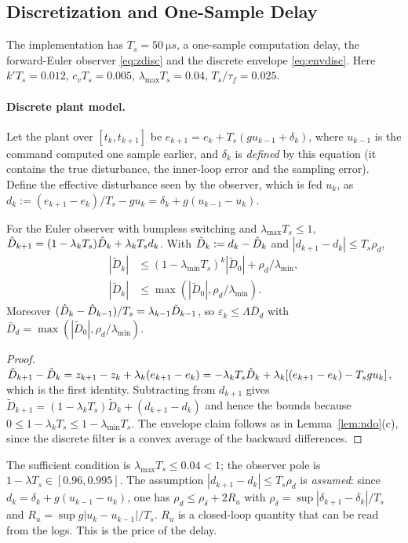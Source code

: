 \subsection{Discretization and One-Sample Delay}\label{ap:disc}
The implementation has $T_s=\SI{50}{\micro s}$, a one-sample computation delay, the forward-Euler observer \eqref{eq:zdisc} and the discrete envelope \eqref{eq:envdisc}. Here $k'T_s=0.012$, $c_vT_s=0.005$, $\lambda_{\max}T_s=0.04$, $T_s/\tau_f=0.025$.

\paragraph{Discrete plant model.} Let the plant over $[t_k,t_{k+1}]$ be $e_{k+1}=e_k+T_s(gu_{k-1}+\delta_k)$, where $u_{k-1}$ is the command computed one sample earlier, and $\delta_k$ is \emph{defined} by this equation (it contains the true disturbance, the inner-loop error and the sampling error). Define the effective disturbance seen by the observer, which is fed $u_k$, as $d_k:=(e_{k+1}-e_k)/T_s-gu_k=\delta_k+g(u_{k-1}-u_k)$.

\begin{lemma}\label{prop:disc-ndo}
For the Euler observer with bumpless switching and $\lambda_{\max}T_s\le1$, $\hat{D}_{k+1}=(1-\lambda_kT_s)\hat{D}_k+\lambda_kT_sd_k$. With $\tilde D_k:=d_k-\hat{D}_k$ and $|d_{k+1}-d_k|\le T_s\rho_d$,
\begin{align*}
|\tilde D_k|&\le(1-\lambda_{\min}T_s)^{k}|\tilde D_0|+\rho_d/\lambda_{\min},\\
|\tilde D_k|&\le\max(|\tilde D_0|,\rho_d/\lambda_{\min}).
\end{align*}
Moreover $(\hat{D}_{k}-\hat{D}_{k-1})/T_s=\lambda_{k-1}\tilde D_{k-1}$, so $\varepsilon_k\le\Lambda\bar D_d$ with $\bar D_d=\max(|\tilde D_0|,\rho_d/\lambda_{\min})$.
\end{lemma}
\begin{proof}
$\hat{D}_{k+1}-\hat{D}_k=z_{k+1}-z_k+\lambda_k(e_{k+1}-e_k)=-\lambda_kT_s\hat{D}_k+\lambda_k[(e_{k+1}-e_k)-T_sgu_k]$, which is the first identity. Subtracting from $d_{k+1}$ gives $\tilde D_{k+1}=(1-\lambda_kT_s)\tilde D_k+(d_{k+1}-d_k)$ and hence the bounds because $0\le1-\lambda_kT_s\le1-\lambda_{\min}T_s$. The envelope claim follows as in Lemma~\ref{lem:ndo}(c), since the discrete filter is a convex average of the backward differences.
\end{proof}
The sufficient condition is $\lambda_{\max}T_s\le0.04<1$; the observer pole is $1-\lambda T_s\in[0.96,0.995]$. The assumption $|d_{k+1}-d_k|\le T_s\rho_d$ is \emph{assumed}: since $d_k=\delta_k+g(u_{k-1}-u_k)$, one has $\rho_d\le\rho_\delta+2R_u$ with $\rho_\delta=\sup|\delta_{k+1}-\delta_k|/T_s$ and $R_u=\sup g|u_k-u_{k-1}|/T_s$. $R_u$ is a closed-loop quantity that can be read from the logs. This is the price of the delay.

